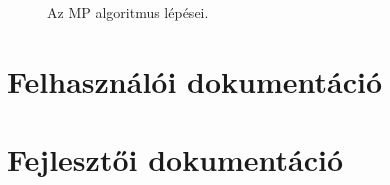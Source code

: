 \documentclass[oneside,titlepage,12pt,a4paper]{report}
\begin{document}
\begin{figure}[htb!]
\caption{Az MP algoritmus lépései.}
\label{fig:mpstep}
\end{figure}


\chapter{Felhasználói dokumentáció}

\chapter{Fejlesztői dokumentáció}
\end{document}
